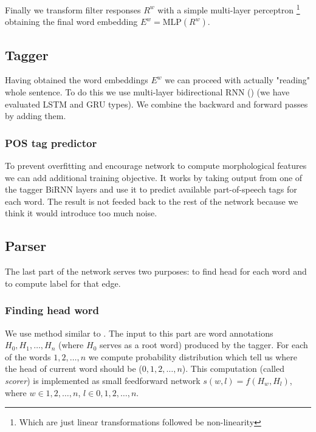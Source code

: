 Finally we transform filter responses $R^w$ with a simple multi-layer perceptron
\footnote{Which are just linear transformations followed be non-linearity}
obtaining the final word embedding $E^w = \text{MLP}(R^w)$.

\subsection{Tagger}
Having obtained the word embeddings $E^w$ we can proceed with actually "reading"
whole sentence. To do this we use multi-layer bidirectional RNN (\cite{schuster_bidirectional_1997})
(we have evaluated LSTM\cite{RNN_LSTM} and GRU\cite{RNN_GRU} types). We combine
the backward and forward passes by adding them.

\subsubsection{POS tag predictor}
To prevent overfitting and encourage network to compute morphological features
we can add additional training objective. It works by taking output from one of
the tagger BiRNN layers and use it to predict available part-of-speech tags for
each word. The result is not feeded back to the rest of the network because we
think it would introduce too much noise.

\subsection{Parser}
The last part of the network serves two purposes: to find head for each word and
to compute label for that edge.

\subsubsection{Finding head word}
We use method similar to \cite{vinyals_pointer_2015}.
The input to this part are word annotations $H_0, H_1, \dots, H_n$ (where $H_0$
serves as a root word) produced by the tagger. For each of the words $1,2,\dots,n$
we compute probability distribution which tell us where the head of current
word should be ($0,1,2,\dots,n$). This computation (called \emph{scorer}) is implemented
as small feedforward network $s(w,l) = f(H_w, H_l)$, where $w \in {1,2,\dots,n}$,
$l \in {0,1,2,\dots,n}$.

